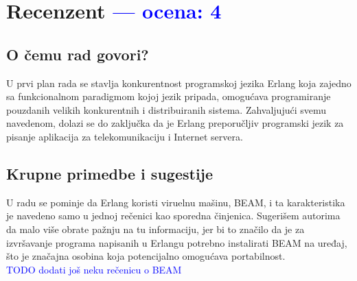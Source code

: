 \documentclass[a4paper]{report}
\newcommand{\odgovor}[1]{\textcolor{blue}{#1}}
\begin{document}
\chapter{Recenzent \odgovor{--- ocena: 4} }


\section{O čemu rad govori?}
U prvi plan rada se stavlja konkurentnost programskoj jezika Erlang koja zajedno sa funkcionalnom paradigmom kojoj jezik pripada, omogućava programiranje pouzdanih velikih konkurentnih i distribuiranih sistema. Zahvaljujući svemu navedenom, dolazi se do zaključka da je Erlang preporučljiv programski jezik za pisanje aplikacija za telekomunikaciju i Internet servera.
\section{Krupne primedbe i sugestije}
U radu se pominje da Erlang koristi viruelnu mašinu, BEAM, i ta karakteristika je navedeno samo u jednoj rečenici kao sporedna činjenica. Sugerišem autorima da malo više obrate pažnju na tu informaciju, jer bi to značilo da je za izvršavanje programa napisanih u Erlangu potrebno instalirati BEAM na uređaj, što je značajna osobina koja potencijalno omogućava portabilnost.\\

\odgovor{TODO dodati još neku rečenicu o BEAM}
\end{document}
